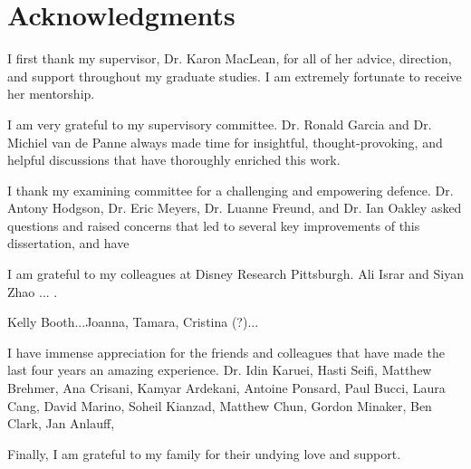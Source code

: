 
\chapter{Acknowledgments}

I first thank my supervisor, Dr. Karon MacLean, for all of her advice, direction, and support throughout my graduate studies.
I am extremely fortunate to receive her mentorship.

I am very grateful to my supervisory committee. Dr. Ronald Garcia and Dr. Michiel van de Panne always made time for insightful, thought-provoking, and helpful discussions that have thoroughly enriched this work.

I thank my examining committee for a challenging and empowering defence.
Dr. Antony Hodgson, Dr. Eric Meyers, Dr. Luanne Freund, and Dr. Ian Oakley asked questions and raised concerns that led to several key improvements of this dissertation, and have 

I am grateful to my colleagues at Disney Research Pittsburgh. Ali Israr and Siyan Zhao ... .

Kelly Booth...Joanna, Tamara, Cristina (?)...

I have immense appreciation for the friends and colleagues that have made the last four years an amazing experience.
Dr. Idin Karuei, Hasti Seifi, Matthew Brehmer, Ana Crisani, Kamyar Ardekani, Antoine Ponsard, Paul Bucci, Laura Cang, David Marino, Soheil Kianzad, Matthew Chun, Gordon Minaker, Ben Clark, Jan Anlauff, 

Finally, I am grateful to my family for their undying love and support.